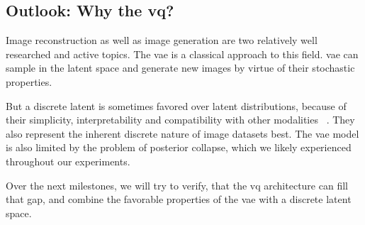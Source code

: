 \subsection{Outlook: Why the \ac{vq}?}\label{subsec:final-words}
Image reconstruction as well as image generation are two relatively well researched and active topics.
The \ac{vae} is a classical approach to this field.
\ac{vae} can sample in the latent space and generate new images by virtue of their stochastic properties.

But a discrete latent is sometimes favored over latent distributions, because of their simplicity, interpretability
and compatibility with other modalities ~\cite{vqvae}.
They also represent the inherent discrete nature of image datasets best.
The \ac{vae} model is also limited by the problem of posterior collapse, which we likely experienced throughout our
experiments.

Over the next milestones, we will try to verify, that the \ac{vq} architecture can fill that gap, and combine the
favorable properties of the \ac{vae} with a discrete latent space.